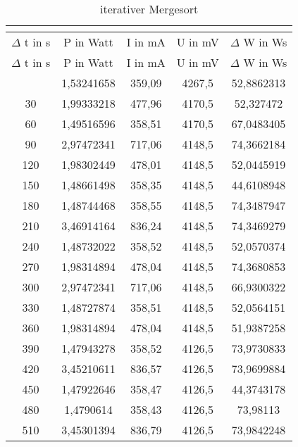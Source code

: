 
\begin{longtable}[c]{ccccc}
\caption{iterativer Mergesort} \\
\label{tab:MergeSortMessungIterativ}\\
\hline
{$\Delta$ t in s} & {P in Watt} & {I in mA} & {U in mV} & {$\Delta$ W in Ws} \\
\hline
\endfirsthead
\hline
$\Delta$ t in s & P in Watt & I in mA & U in mV & $\Delta$ W in Ws \\
\hline
\endhead
\hline
\endfoot
\hline
  \midrule
    0     & 1,53241658 & 359,09 & 4267,5 & 52,8862313 \\
    \midrule
    30    & 1,99333218 & 477,96 & 4170,5 & 52,327472 \\
    \midrule
    60    & 1,49516596 & 358,51 & 4170,5 & 67,0483405 \\
    \midrule
    90    & 2,97472341 & 717,06 & 4148,5 & 74,3662184 \\
    \midrule
    120   & 1,98302449 & 478,01 & 4148,5 & 52,0445919 \\
    \midrule
    150   & 1,48661498 & 358,35 & 4148,5 & 44,6108948 \\
    \midrule
    180   & 1,48744468 & 358,55 & 4148,5 & 74,3487947 \\
    \midrule
    210   & 3,46914164 & 836,24 & 4148,5 & 74,3469279 \\
    \midrule
    240   & 1,48732022 & 358,52 & 4148,5 & 52,0570374 \\
    \midrule
    270   & 1,98314894 & 478,04 & 4148,5 & 74,3680853 \\
    \midrule
    300   & 2,97472341 & 717,06 & 4148,5 & 66,9300322 \\
    \midrule
    330   & 1,48727874 & 358,51 & 4148,5 & 52,0564151 \\
    \midrule
    360   & 1,98314894 & 478,04 & 4148,5 & 51,9387258 \\
    \midrule
    390   & 1,47943278 & 358,52 & 4126,5 & 73,9730833 \\
    \midrule
    420   & 3,45210611 & 836,57 & 4126,5 & 73,9699884 \\
    \midrule
    450   & 1,47922646 & 358,47 & 4126,5 & 44,3743178 \\
    \midrule
    480   & 1,4790614 & 358,43 & 4126,5 & 73,98113 \\
    \midrule
    510   & 3,45301394 & 836,79 & 4126,5 & 73,9842248 \\
    \midrule

\end{longtable}
